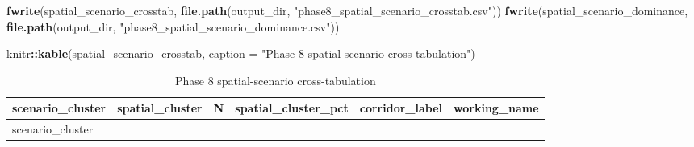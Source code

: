 \documentclass[
]{article}
\newenvironment{Shaded}{\begin{snugshade}}{\end{snugshade}}
\newcommand{\AttributeTok}[1]{\textcolor[rgb]{0.13,0.29,0.53}{#1}}
\newcommand{\FunctionTok}[1]{\textcolor[rgb]{0.13,0.29,0.53}{\textbf{#1}}}
\newcommand{\NormalTok}[1]{#1}
\newcommand{\SpecialCharTok}[1]{\textcolor[rgb]{0.81,0.36,0.00}{\textbf{#1}}}
\newcommand{\StringTok}[1]{\textcolor[rgb]{0.31,0.60,0.02}{#1}}
\begin{document}
\begin{Shaded}
\begin{Highlighting}[]
\FunctionTok{fwrite}\NormalTok{(spatial\_scenario\_crosstab, }\FunctionTok{file.path}\NormalTok{(output\_dir, }\StringTok{"phase8\_spatial\_scenario\_crosstab.csv"}\NormalTok{))}
\FunctionTok{fwrite}\NormalTok{(spatial\_scenario\_dominance, }\FunctionTok{file.path}\NormalTok{(output\_dir, }\StringTok{"phase8\_spatial\_scenario\_dominance.csv"}\NormalTok{))}

\NormalTok{knitr}\SpecialCharTok{::}\FunctionTok{kable}\NormalTok{(spatial\_scenario\_crosstab, }\AttributeTok{caption =} \StringTok{"Phase 8 spatial{-}scenario cross{-}tabulation"}\NormalTok{)}
\end{Highlighting}
\end{Shaded}

\begin{longtable}[]{@{}
  >{\raggedleft\arraybackslash}p{}
  >{\raggedleft\arraybackslash}p{}
  >{\raggedleft\arraybackslash}p{}
  >{\raggedleft\arraybackslash}p{}
  >{\raggedright\arraybackslash}p{}
  >{\raggedright\arraybackslash}p{}@{}}
\caption{Phase 8 spatial-scenario cross-tabulation}\tabularnewline
\toprule\noalign{}
\begin{minipage}[b]{\linewidth}\raggedleft
scenario\_cluster
\end{minipage} & \begin{minipage}[b]{\linewidth}\raggedleft
spatial\_cluster
\end{minipage} & \begin{minipage}[b]{\linewidth}\raggedleft
N
\end{minipage} & \begin{minipage}[b]{\linewidth}\raggedleft
spatial\_cluster\_pct
\end{minipage} & \begin{minipage}[b]{\linewidth}\raggedright
corridor\_label
\end{minipage} & \begin{minipage}[b]{\linewidth}\raggedright
working\_name
\end{minipage} \\
\midrule\noalign{}
\endfirsthead
\toprule\noalign{}
\begin{minipage}[b]{\linewidth}\raggedleft
scenario\_cluster
\end{minipage} & \begin{minipage}[b]{\linewidth}\raggedleft

\end{minipage}
\end{longtable}
\end{document}
